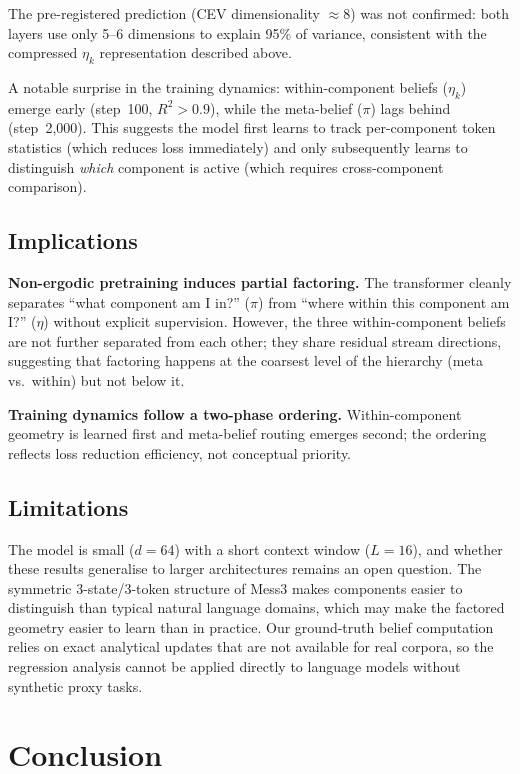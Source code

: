 \documentclass{article}
\begin{document}
The pre-registered prediction (CEV dimensionality $\approx 8$) was not confirmed:
both layers use only 5--6 dimensions to explain 95\% of variance, consistent with
the compressed $\eta_k$ representation described above.

A notable surprise in the training dynamics: within-component beliefs ($\eta_k$)
emerge early (step~100, $R^2 > 0.9$), while the meta-belief ($\pi$) lags behind
(step~2{,}000).
This suggests the model first learns to track per-component token statistics
(which reduces loss immediately) and only subsequently learns to distinguish
\emph{which} component is active (which requires cross-component comparison).

\subsection{Implications}

\textbf{Non-ergodic pretraining induces partial factoring.}
The transformer cleanly separates ``what component am I in?'' ($\pi$) from
``where within this component am I?'' ($\eta$) without explicit supervision.
However, the three within-component beliefs are not further separated from each
other; they share residual stream directions, suggesting that factoring happens
at the coarsest level of the hierarchy (meta vs.\ within) but not below it.

\textbf{Training dynamics follow a two-phase ordering.}
Within-component geometry is learned first and meta-belief routing emerges
second; the ordering reflects loss reduction efficiency, not conceptual
priority.


\subsection{Limitations}

The model is small ($d=64$) with a short context window ($L=16$), and whether
these results generalise to larger architectures remains an open question.
The symmetric 3-state/3-token structure of Mess3 makes components easier to
distinguish than typical natural language domains, which may make the factored
geometry easier to learn than in practice.
Our ground-truth belief computation relies on exact analytical updates that are
not available for real corpora, so the regression analysis cannot be applied
directly to language models without synthetic proxy tasks.

\section{Conclusion}
\label{sec:conclusion}
\end{document}
